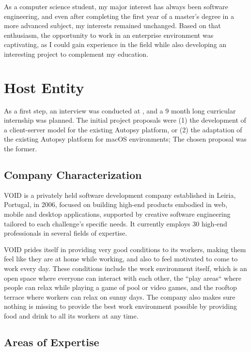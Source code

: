 As a computer science student, my major interest has always been software engineering, and even after completing the first year of a master's degree in a more advanced subject, 
my interests remained unchanged. Based on that enthusiasm, the opportunity to work in an enterprise environment was captivating, as I could gain experience in the 
field while also developing an interesting project to complement my education.

\section{Host Entity}

As a first step, an interview was conducted at \company \cite{void}, and a 9 month long curricular internship was planned. The initial project proposals were (1) the development of a 
client-server model for the existing Autopsy platform, or (2) the adaptation of the existing Autopsy platform for macOS \cite{macos} environments; The chosen proposal was the former.

\subsection{Company Characterization}

VOID is a privately held software development company established in Leiria, Portugal, in 2006, focused on building high-end products embodied in web, 
mobile and desktop applications, supported by creative software engineering tailored to each challenge's specific needs. 
It currently employs 30 high-end professionals in several fields of expertise.

VOID prides itself in providing very good conditions to its workers, making them feel like they are at home while working,
and also to feel motivated to come to work every day. These conditions include the work environment itself, which is an open space where 
everyone can interact with each other, the ``play areas`` where people can relax while playing a game of pool or video games, and the rooftop terrace where workers can relax on sunny days.
The company also makes sure nothing is missing to provide the best work environment possible by providing food and drink to all its workers at any time.

\subsection{Areas of Expertise}

